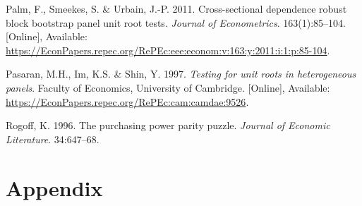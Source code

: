 \documentclass[11pt,preprint, authoryear]{elsarticle}
\numberwithin{equation}{section}
\numberwithin{figure}{section}
\numberwithin{table}{section}
\newlength{\cslhangindent}
\newenvironment{CSLReferences}%
  {\setlength{\parindent}{0pt}%
  \everypar{\setlength{\hangindent}{\cslhangindent}}\ignorespaces}%
  {\par}
\begin{document}
\begin{CSLReferences}{1}{0}
\leavevmode\hypertarget{ref-pal}{}%
Palm, F., Smeekes, S. \& Urbain, J.-P. 2011. Cross-sectional dependence
robust block bootstrap panel unit root tests. \emph{Journal of
Econometrics}. 163(1):85--104. {[}Online{]}, Available:
\url{https://EconPapers.repec.org/RePEc:eee:econom:v:163:y:2011:i:1:p:85-104}.

\leavevmode\hypertarget{ref-im}{}%
Pasaran, M.H., Im, K.S. \& Shin, Y. 1997. \emph{Testing for unit roots
in heterogeneous panels}. Faculty of Economics, University of Cambridge.
{[}Online{]}, Available:
\url{https://EconPapers.repec.org/RePEc:cam:camdae:9526}.

\leavevmode\hypertarget{ref-rog}{}%
Rogoff, K. 1996. The purchasing power parity puzzle. \emph{Journal of
Economic Literature}. 34:647--68.

\end{CSLReferences}

\newpage

\hypertarget{appendix}{%
\section*{\texorpdfstring{Appendix
\label{A}}{Appendix }}\label{appendix}}
\end{document}
